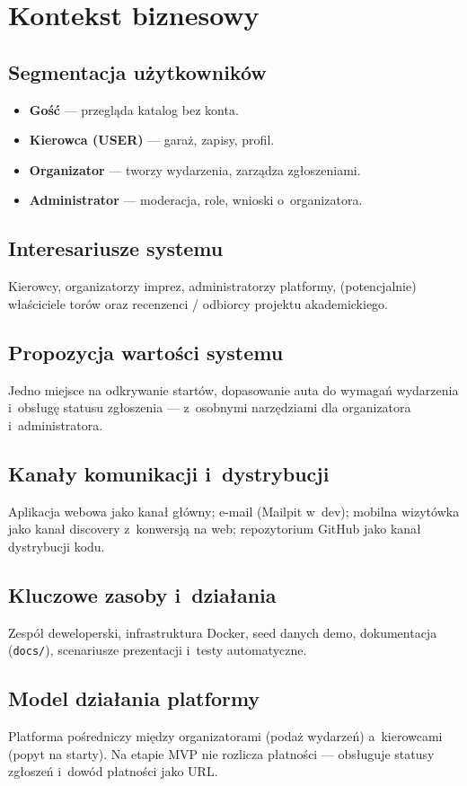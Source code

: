 \documentclass{sprz}
\begin{document}
\chapter{Kontekst biznesowy}
\section{Segmentacja użytkowników}
\begin{itemize}
  \item \textbf{Gość} --- przegląda katalog bez konta.
  \item \textbf{Kierowca (USER)} --- garaż, zapisy, profil.
  \item \textbf{Organizator} --- tworzy wydarzenia, zarządza zgłoszeniami.
  \item \textbf{Administrator} --- moderacja, role, wnioski o~organizatora.
\end{itemize}

\section{Interesariusze systemu}
Kierowcy, organizatorzy imprez, administratorzy platformy, (potencjalnie) właściciele torów oraz recenzenci / odbiorcy projektu akademickiego.

\section{Propozycja wartości systemu}
Jedno miejsce na odkrywanie startów, dopasowanie auta do wymagań wydarzenia i~obsługę statusu zgłoszenia --- z~osobnymi narzędziami dla organizatora i~administratora.

\section{Kanały komunikacji i~dystrybucji}
Aplikacja webowa jako kanał główny; e-mail (Mailpit w~dev); mobilna wizytówka jako kanał discovery z~konwersją na web; repozytorium GitHub jako kanał dystrybucji kodu.

\section{Kluczowe zasoby i~działania}
Zespół deweloperski, infrastruktura Docker, seed danych demo, dokumentacja (\texttt{docs/}), scenariusze prezentacji i~testy automatyczne.

\section{Model działania platformy}
Platforma pośredniczy między organizatorami (podaż wydarzeń) a~kierowcami (popyt na starty). Na etapie MVP nie rozlicza płatności --- obsługuje statusy zgłoszeń i~dowód płatności jako URL.
\end{document}
